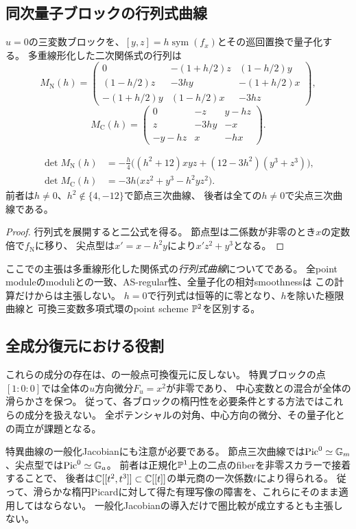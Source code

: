 \subsection{同次量子ブロックの行列式曲線}
$u=0$の三変数ブロックを、$[y,z]=h\operatorname{sym}(f_x)$とその巡回置換で量子化する。
多重線形化した二次関係式の行列は
\begin{equation}
 M_{\mathrm N}(h)=\begin{pmatrix}
 0&-(1+h/2)z&(1-h/2)y\\
 (1-h/2)z&-3hy&-(1+h/2)x\\
 -(1+h/2)y&(1-h/2)x&-3hz
 \end{pmatrix},
\end{equation}
\begin{equation}
 M_{\mathrm C}(h)=\begin{pmatrix}0&-z&y-hz\\z&-3hy&-x\\-y-hz&x&-hx\end{pmatrix}.
\end{equation}
\begin{proposition}\label{ne:quantum}
\begin{equation}\begin{aligned}
 \det M_{\mathrm N}(h)&=-\frac h4\bigl((h^2+12)xyz+(12-3h^2)(y^3+z^3)\bigr),\\
 \det M_{\mathrm C}(h)&=-3h\bigl(xz^2+y^3-h^2yz^2\bigr).
\end{aligned}\end{equation}
前者は$h\ne0$、$h^2\notin\{4,-12\}$で節点三次曲線、
後者は全ての$h\ne0$で尖点三次曲線である。
\end{proposition}
\begin{proof}
行列式を展開すると二公式を得る。
節点型は二係数が非零のとき$x$の定数倍で$f_{\mathrm N}$に移り、
尖点型は$x'=x-h^2y$により$x'z^2+y^3$となる。
\end{proof}
ここでの主張は多重線形化した関係式の\emph{行列式曲線}についてである。
全point moduleのmoduliとの一致、AS-regular性、全量子化の相対smoothnessは
この計算だけからは主張しない。
$h=0$で行列式は恒等的に零となり、$h$を除いた極限曲線と
可換三変数多項式環のpoint scheme $\mathbb P^2$を区別する。

\subsection{全成分復元における役割}
これらの成分の存在は、\cite{NCCubicMain}の一般点可換復元に反しない。
特異ブロックの点$[1:0:0]$では全体の$u$方向微分$F_u=x^2$が非零であり、
中心変数との混合が全体の滑らかさを保つ。
従って、各ブロックの楕円性を必要条件とする方法ではこれらの成分を扱えない。
全ポテンシャルの対角、中心方向の微分、その量子化との両立が課題となる。

特異曲線の一般化Jacobianにも注意が必要である。
節点三次曲線では$\operatorname{Pic}^0\simeq\mathbb G_m$、尖点型では$\operatorname{Pic}^0\simeq\mathbb G_a$。
前者は正規化$\mathbb P^1$上の二点のfiberを非零スカラーで接着することで、
後者は$\mathbb C[[t^2,t^3]]\subset\mathbb C[[t]]$の単元商の一次係数$t$により得られる。
従って、滑らかな楕円Picardに対して得た有理写像の障害を、これらにそのまま適用してはならない。
一般化Jacobianの導入だけで圏比較が成立するとも主張しない。

